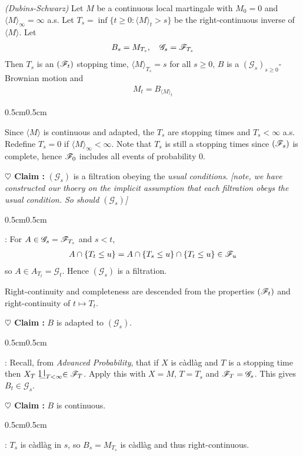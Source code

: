 \documentclass[12pt,a4paper]{article}
\newenvironment{proof}
{\begin{changemargin}{0.5cm}{0.5cm} 
	}%
	{\end{changemargin}
}
\newenvironment{subproof}
{\begin{changemargin}{0.5cm}{0.5cm} 
	}%
	{\end{changemargin}
}
\newenvironment{p}
{\begin{proof} 
	}%
	{\end{proof}
}
\begin{document}
\thm \emph{(Dubins-Schwarz)} Let $M$ be a continuous local martingale with $M_0 =0$ and $\langle M \rangle_{\infty} =\infty$ a.s. Let $T_s = \inf \{t\geq 0 : \langle M \rangle_t >s \}$ be the right-continuous inverse of $\langle M \rangle$. Let
\begin{align*}
B_s = M_{T_s}, \quad \mathscr{G}_s = \mathscr{F}_{T_s}
\end{align*}
Then $T_s$ is an $(\mathscr{F}_t)$ stopping time, $\langle M \rangle_{T_s}=s$ for all $s\geq 0$, $B$ is a $(\mathscr{G}_s)_{s\geq 0}$-Brownian motion and
\begin{align*}
M_t = B_{\langle M \rangle_t}
\end{align*}
\begin{p}
\pf Since $\langle M \rangle$ is continuous and adapted, the $T_s$ are stopping times and $T_s < \infty$ a.s. Redefine $T_s =0$ if $\langle M \rangle_{\infty} < \infty$. Note that $T_s$ is still a stopping times since $(\mathscr{F}_s)$ is complete, hence $\mathscr{F}_0$ includes all events of probability 0.

\textbf{$\heartsuit$ Claim :} $(\mathscr{G}_s)$ is a filtration obeying the \emph{usual conditions}. \emph{[note, we have constructed our thoery on the implicit assumption that each filtration obeys the usual condition. So should $(\mathscr{G}_s)$]}
\begin{subproof}
: For $A\in \mathscr{G}_s = \mathscr{F}_{T_s}$ and $s<t$,
\begin{align*}
A \cap \{T_t \leq u\} = A \cap \{T_s \leq u \} \cap \{T_t \leq u\} \in \mathscr{F}_u
\end{align*}
so $A\in A_{T_t} = \mathscr{G}_t$. Hence $(\mathscr{G}_s)$ is a filtration.
\s

Right-continuity and completeness are descended from the properties $(\mathscr{F}_t)$ and right-continuity of $t\mapsto T_t$. 
\end{subproof}
\textbf{$\heartsuit$ Claim :} $B$ is adapted to $(\mathscr{G}_s)$.
\begin{subproof}
: Recall, from \emph{Advanced Probability}, that if $X$ is c\`adl\`ag and $T$ is a stopping time then $X_T \charac_{T<\infty} \in \FF_T$. Apply this with $X=M$, $T=T_s$ and $\mathscr{F}_T = \mathscr{G}_s$. This gives $B_t \in \mathscr{G}_s$.
\end{subproof}
\textbf{$\heartsuit$ Claim :} $B$ is continuous.
\begin{subproof}
: $T_s$ is c\`adl\`ag in $s$, so $B_s = M_{T_s}$ is c\`adl\`ag and thus right-continuous.


\end{subproof}
\end{p}
\end{document}
